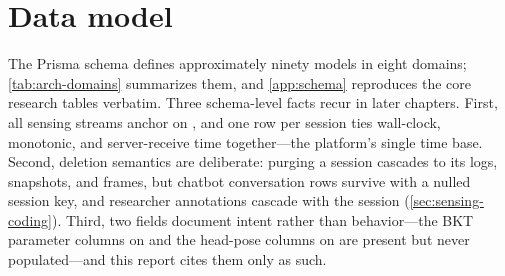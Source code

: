 \section{Data model}
\label{sec:arch-datamodel}

The Prisma schema defines approximately ninety models in eight domains;
\cref{tab:arch-domains} summarizes them, and
\cref{app:schema} reproduces the core research tables verbatim. Three
schema-level facts recur in later chapters. First, all sensing streams
anchor on , and one
 row per session ties wall-clock,
monotonic, and server-receive time together---the platform's single time
base. Second, deletion semantics are deliberate: purging a session
cascades to its logs, snapshots, and frames, but chatbot conversation
rows survive with a nulled session key, and researcher annotations
cascade with the session (\cref{sec:sensing-coding}). Third, two fields
document intent rather than behavior---the BKT parameter columns on
 and the head-pose columns on
 are present but never populated---and this report
cites them only as such.

